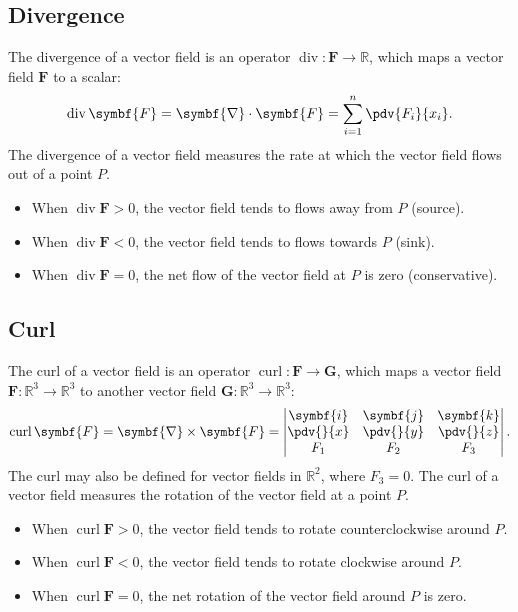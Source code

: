 \documentclass{article}
\DeclareMathOperator{\divergence}{div}
\DeclareMathOperator{\curl}{curl}
\begin{document}
\subsection{Divergence}
The divergence of a vector field is an operator \(\divergence :
\symbf{F} \to \mathbb{R}\), which maps a vector field \(\symbf{F}\) to
a scalar:
\begin{equation*}
    \divergence \symbf{F} = \symbf{\nabla} \cdot \symbf{F} = \sum_{i=1}^{n} \pdv{F_i}{x_i}.
\end{equation*}
The divergence of a vector field measures the rate at which the vector
field flows out of a point \(P\).
\begin{itemize}
    \item When \(\divergence \symbf{F} > 0\), the vector field tends to
          flows away from \(P\) (source).
    \item When \(\divergence \symbf{F} < 0\), the vector field tends to
          flows towards \(P\) (sink).
    \item When \(\divergence \symbf{F} = 0\), the net flow of the
          vector field at \(P\) is zero (conservative).
\end{itemize}
\subsection{Curl}
The curl of a vector field is an operator \(\curl : \symbf{F} \to
\symbf{G}\), which maps a vector field \(\symbf{F} : \mathbb{R}^3 \to
\mathbb{R}^3\) to another vector field \(\symbf{G} : \mathbb{R}^3 \to
\mathbb{R}^3\):
\begin{equation*}
    \curl \symbf{F} = \symbf{\nabla} \times \symbf{F} =
    \begin{vmatrix}
        \symbf{i}              & \symbf{j}              & \symbf{k}              \\
        \displaystyle\pdv{}{x} & \displaystyle\pdv{}{y} & \displaystyle\pdv{}{z} \\
        F_1                    & F_2                    & F_3
    \end{vmatrix}
    .
\end{equation*}
The curl may also be defined for vector fields in \(\mathbb{R}^2\), where
\(F_3 = 0\). The curl of a vector field measures the rotation of the
vector field at a point \(P\).
\begin{itemize}
    \item When \(\curl \symbf{F} > 0\), the vector field tends to
          rotate counterclockwise around \(P\).
    \item When \(\curl \symbf{F} < 0\), the vector field tends to
          rotate clockwise around \(P\).
    \item When \(\curl \symbf{F} = 0\), the net rotation of the vector
          field around \(P\) is zero.
\end{itemize}
\end{document}

